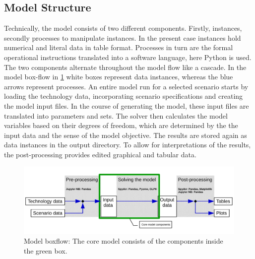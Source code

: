 \documentclass[article]{elsarticle}
\begin{document}
\subsection{Model Structure}
Technically, the model consists of two different components. Firstly, instances, secondly processes to manipulate instances. In the present case instances hold numerical and literal data in table format. Processes in turn are the formal operational instructions translated into a software language, here Python is used. The two components alternate throughout the model flow like a cascade. In the model box-flow in \cref{fig:model_boxflow} white boxes represent data instances, whereas the blue arrows represent processes. An entire model run for a selected scenario starts by loading the technology data, incorporating scenario specifications and creating the model input files. In the course of generating the model, these input files are translated into parameters and sets. The solver then calculates the model variables based on their degrees of freedom, which are determined by the the input data and the sense of the model objective. The results are stored again as data instances in the output directory. To allow for interpretations of the results, the post-processing provides edited graphical and tabular data.

\begin{figure}[tbh]
    \centering
    \includegraphics[width=\textwidth]{figures/model_boxflow_paper.pdf}
    \caption{Model boxflow: The core model consists of the components inside the green box.}
    \label{fig:model_boxflow}
\end{figure}
\end{document}
